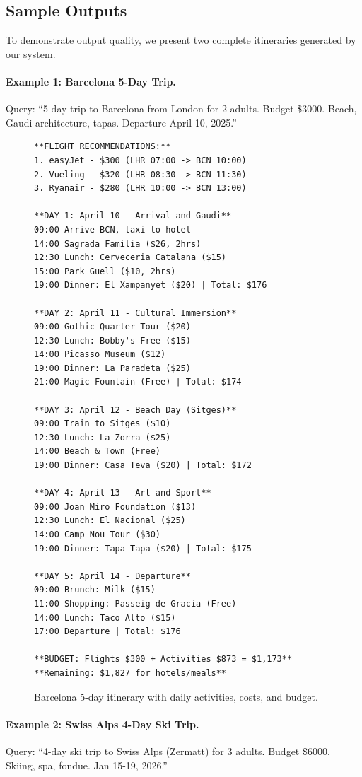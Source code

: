 \documentclass[10pt,twocolumn]{article}
\begin{document}
\subsection{Sample Outputs}
To demonstrate output quality, we present two complete itineraries generated by our system.

\paragraph{Example 1: Barcelona 5-Day Trip.}
Query: ``5-day trip to Barcelona from London for 2 adults. Budget \$3000. Beach, Gaudi architecture, tapas. Departure April 10, 2025.''

\begin{figure}[!htbp]
\scriptsize
\begin{verbatim}
**FLIGHT RECOMMENDATIONS:**
1. easyJet - $300 (LHR 07:00 -> BCN 10:00)
2. Vueling - $320 (LHR 08:30 -> BCN 11:30)  
3. Ryanair - $280 (LHR 10:00 -> BCN 13:00)

**DAY 1: April 10 - Arrival and Gaudi**
09:00 Arrive BCN, taxi to hotel
14:00 Sagrada Familia ($26, 2hrs)
12:30 Lunch: Cerveceria Catalana ($15)
15:00 Park Guell ($10, 2hrs)  
19:00 Dinner: El Xampanyet ($20) | Total: $176

**DAY 2: April 11 - Cultural Immersion**
09:00 Gothic Quarter Tour ($20)
12:30 Lunch: Bobby's Free ($15)
14:00 Picasso Museum ($12)
19:00 Dinner: La Paradeta ($25)
21:00 Magic Fountain (Free) | Total: $174

**DAY 3: April 12 - Beach Day (Sitges)**
09:00 Train to Sitges ($10)
12:30 Lunch: La Zorra ($25)
14:00 Beach & Town (Free)
19:00 Dinner: Casa Teva ($20) | Total: $172

**DAY 4: April 13 - Art and Sport**
09:00 Joan Miro Foundation ($13)
12:30 Lunch: El Nacional ($25)
14:00 Camp Nou Tour ($30)
19:00 Dinner: Tapa Tapa ($20) | Total: $175

**DAY 5: April 14 - Departure**
09:00 Brunch: Milk ($15)
11:00 Shopping: Passeig de Gracia (Free)
14:00 Lunch: Taco Alto ($15)
17:00 Departure | Total: $176

**BUDGET: Flights $300 + Activities $873 = $1,173**
**Remaining: $1,827 for hotels/meals**
\end{verbatim}
\caption{Barcelona 5-day itinerary with daily activities, costs, and budget.}
\label{fig:barcelona_output}
\end{figure}

\paragraph{Example 2: Swiss Alps 4-Day Ski Trip.}
Query: ``4-day ski trip to Swiss Alps (Zermatt) for 3 adults. Budget \$6000. Skiing, spa, fondue. Jan 15-19, 2026.''
\end{document}
